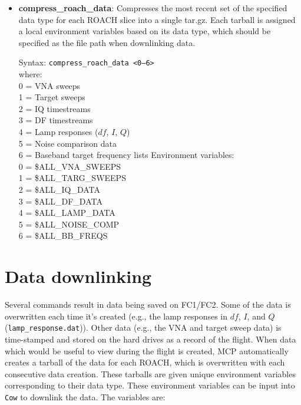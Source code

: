 \begin{itemize}[leftmargin=*,label={}]

\item \textbf{compress\_roach\_data}: Compresses the most recent set of the specified data type for each ROACH slice into a single tar.gz. Each tarball is assigned a local environment variables based on its data type, which should be specified as the file path when downlinking data.

Syntax: \texttt{compress\_roach\_data <0--6>}\\
where:\\
0 = VNA sweeps\\
1 = Target sweeps\\
2 = IQ timestreams\\
3 = DF timestreams\\
4 = Lamp responses ($df$, $I$, $Q$)\\
5 = Noise comparison data\\
6 = Baseband target frequency lists\newline\newline
Environment variables:\\
0 = \$ALL\_VNA\_SWEEPS\\
1 = \$ALL\_TARG\_SWEEPS\\
2 = \$ALL\_IQ\_DATA\\
3 = \$ALL\_DF\_DATA\\
4 = \$ALL\_LAMP\_DATA\\
5 = \$ALL\_NOISE\_COMP\\
6 = \$ALL\_BB\_FREQS\\

\end{itemize}

\section{Data downlinking}

Several commands result in data being saved on FC1/FC2. Some of the data is overwritten each time it’s created (e.g., the lamp responses in $df$, $I$, and $Q$ (\texttt{lamp\_response.dat})). Other data (e.g., the VNA and target sweep data) is time-stamped and stored on the hard drives as a record of the flight. When data which would be useful to view during the flight is created, MCP automatically creates a tarball of the data for each ROACH, which is overwritten with each consecutive data creation. These tarballs are given unique environment variables corresponding to their data type. These environment variables can be input into \texttt{Cow} to downlink the data. The variables are:

